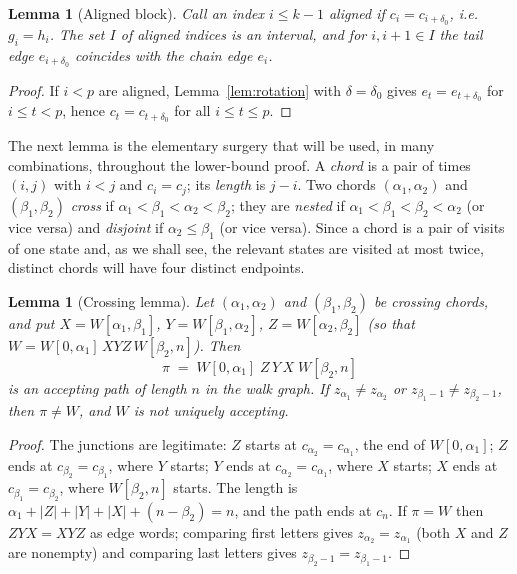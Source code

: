 \documentclass[11pt]{article}
\newtheorem{lemma}[theorem]{Lemma}
\theoremstyle{definition}
\begin{document}
\begin{lemma}[Aligned block]\label{lem:block}
Call an index $i\le k-1$ \emph{aligned} if $c_i=c_{i+\delta_0}$, i.e.\
$g_i=h_i$. The set $I$ of aligned indices is an interval, and for
$i,i+1\in I$ the tail edge $e_{i+\delta_0}$ coincides with the chain edge
$e_i$.
\end{lemma}

\begin{proof}
If $i<p$ are aligned, Lemma~\ref{lem:rotation} with $\delta=\delta_0$ gives
$e_t=e_{t+\delta_0}$ for $i\le t<p$, hence $c_t=c_{t+\delta_0}$ for all
$i\le t\le p$.
\end{proof}

The next lemma is the elementary surgery that will be used, in many
combinations, throughout the lower-bound proof. A \emph{chord} is a pair of
times $(i,j)$ with $i<j$ and $c_i=c_j$; its \emph{length} is $j-i$. Two chords
$(\alpha_1,\alpha_2)$ and $(\beta_1,\beta_2)$ \emph{cross} if
$\alpha_1<\beta_1<\alpha_2<\beta_2$; they are \emph{nested} if
$\alpha_1<\beta_1<\beta_2<\alpha_2$ (or vice versa) and \emph{disjoint} if
$\alpha_2\le\beta_1$ (or vice versa). Since a chord is a pair of visits of one
state and, as we shall see, the relevant states are visited at most twice,
distinct chords will have four distinct endpoints.

\begin{lemma}[Crossing lemma]\label{lem:cross}
Let $(\alpha_1,\alpha_2)$ and $(\beta_1,\beta_2)$ be crossing chords, and put
$X=W[\alpha_1,\beta_1]$, $Y=W[\beta_1,\alpha_2]$, $Z=W[\alpha_2,\beta_2]$
(so that $W=W[0,\alpha_1]\,XYZ\,W[\beta_2,n]$). Then
\[
\pi\;=\;W[0,\alpha_1]\;Z\,Y\,X\;W[\beta_2,n]
\]
is an accepting path of length $n$ in the walk graph. If
$z_{\alpha_1}\ne z_{\alpha_2}$ or $z_{\beta_1-1}\ne z_{\beta_2-1}$, then
$\pi\ne W$, and $W$ is not uniquely accepting.
\end{lemma}

\begin{proof}
The junctions are legitimate: $Z$ starts at $c_{\alpha_2}=c_{\alpha_1}$, the
end of $W[0,\alpha_1]$; $Z$ ends at $c_{\beta_2}=c_{\beta_1}$, where $Y$
starts; $Y$ ends at $c_{\alpha_2}=c_{\alpha_1}$, where $X$ starts; $X$ ends at
$c_{\beta_1}=c_{\beta_2}$, where $W[\beta_2,n]$ starts. The length is
$\alpha_1+|Z|+|Y|+|X|+(n-\beta_2)=n$, and the path ends at $c_n$. If $\pi=W$
then $ZYX=XYZ$ as edge words; comparing first letters gives
$z_{\alpha_2}=z_{\alpha_1}$ (both $X$ and $Z$ are nonempty) and comparing last
letters gives $z_{\beta_2-1}=z_{\beta_1-1}$.
\end{proof}
\end{document}
